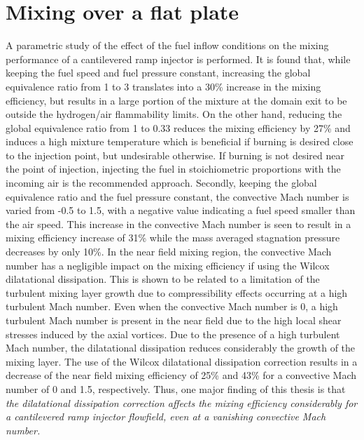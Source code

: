 \section{Mixing over a flat plate}



A parametric study of the effect of the fuel inflow conditions on the mixing
performance of a cantilevered ramp injector  is performed.
It is found that, while keeping the fuel speed and fuel pressure constant, increasing
the global
equivalence ratio from 1 to 3 translates into a 30\% increase in the mixing efficiency,
but results in a large portion
of the mixture at the domain exit to be outside the hydrogen/air flammability limits.
On the other hand, reducing the global equivalence ratio from 1 to 0.33 reduces the mixing
efficiency by 27\%
and induces a high mixture temperature which is beneficial if burning
is desired close to the injection point, but undesirable otherwise. If burning
is not desired near the point of injection, injecting the fuel in stoichiometric
proportions with the incoming air is the recommended approach.
Secondly, keeping the global equivalence ratio and the fuel pressure constant,
the convective Mach number is varied from -0.5 to 1.5, with a negative value indicating
a fuel speed smaller than the air speed. This increase in the convective
Mach number is seen to result in a mixing efficiency increase
of 31\%  while the mass averaged stagnation pressure
decreases by only 10\%. In the near field mixing region,
the convective Mach number has a negligible impact on the mixing efficiency if using
the Wilcox dilatational dissipation. This is
shown to be related to a limitation of the turbulent mixing layer growth
due to compressibility effects occurring at a high turbulent Mach number.
Even when the convective Mach number is 0, a high turbulent Mach number is
present in the near field due to the high local shear stresses
induced by the axial vortices. Due to the presence of a high turbulent Mach number,
the dilatational dissipation reduces considerably the growth of the mixing layer.
The use of the Wilcox dilatational dissipation correction results in a decrease
of the near field mixing efficiency of 25\% and 43\% for a convective
Mach number of 0 and 1.5, respectively.
Thus, one major finding of this thesis is that \emph{the dilatational dissipation
correction affects the mixing efficiency considerably for a cantilevered
ramp injector flowfield, even at a vanishing convective Mach number.}




